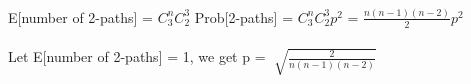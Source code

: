 \begin{problem}{1} ~\\
E[number of 2-paths] = $C_3^n C_2^3$ Prob[2-paths] = $C_3^n C_2^3 p^2$ = $\frac{n(n-1)(n-2)}{2} p^2$\\
\\
Let E[number of 2-paths] = 1, we get p = $\sqrt[]{\frac{2}{n(n-1)(n-2)}}$
\end{problem}